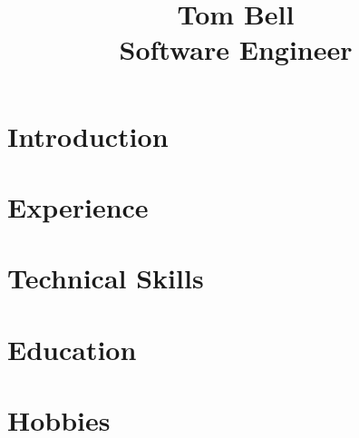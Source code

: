 \documentclass{article}
\begin{document}
\title{Tom Bell \\
  \large Software Engineer}
\author{}
\date{}

\maketitle

\section{Introduction}
\section{Experience}
\section{Technical Skills}
\section{Education}
\section{Hobbies}
\end{document}
